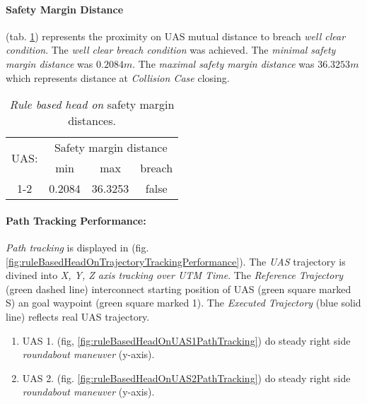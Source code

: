 \paragraph{Safety Margin Distance} (tab. \ref{tab:testCaseRuleBasedHeadOnSafetyMarginDistances}) represents the proximity on UAS mutual distance to breach \emph{well clear condition}. The \emph{well clear breach condition} was achieved. The \emph{minimal safety margin distance} was $0.2084 m$. The \emph{maximal safety margin distance} was $36.3253 m$ which represents distance at \emph{Collision Case} closing. 

\begin{table}[H]
    \centering
    \begin{tabular}{c||c|c|c}
        \multirow{2}{*}{UAS:} & \multicolumn{3}{c}{Safety margin distance} \\ \cline{2-4} 
                  & min          & max         & breach         \\ \hline\hline
            1-2   & 0.2084       & 36.3253     & false          \\ 
    \end{tabular}
    \caption{\emph{Rule based head on} safety margin distances.}
    \label{tab:testCaseRuleBasedHeadOnSafetyMarginDistances}
\end{table}

\paragraph{Path Tracking Performance:} \emph{Path tracking} is displayed in (fig. \ref{fig:ruleBasedHeadOnTrajectoryTrackingPerformance}). The \emph{UAS} trajectory is divined into \emph{X, Y, Z axis tracking over UTM Time}. The \emph{Reference Trajectory} (green dashed line) interconnect starting position of UAS (green square marked S) an goal waypoint (green square marked 1). The \emph{Executed Trajectory} (blue solid line) reflects real UAS trajectory. 

\begin{enumerate}
    \item UAS 1. (fig, \ref{fig:ruleBasedHeadOnUAS1PathTracking}) do steady right side \emph{roundabout maneuver} (y-axis).
    
    \item UAS 2. (fig. \ref{fig:ruleBasedHeadOnUAS2PathTracking}) do steady right side \emph{roundabout maneuver} (y-axis).
\end{enumerate}

